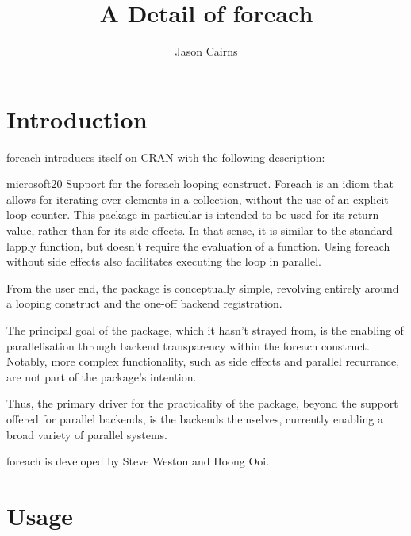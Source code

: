 \documentclass[a4paper,10pt]{article}
\begin{document}
\title{A Detail of foreach}
\author{Jason Cairns}
  
\maketitle{}


\section{Introduction}
\label{sec:introduction}

foreach introduces itself on CRAN with the following description:
\begin{displaycquote}{microsoft20}
  Support for the foreach looping construct. Foreach is an idiom that
  allows for iterating over elements in a collection, without the use
  of an explicit loop counter. This package in particular is intended
  to be used for its return value, rather than for its side effects.
  In that sense, it is similar to the standard lapply function, but
  doesn't require the evaluation of a function. Using foreach without
  side effects also facilitates executing the loop in parallel.
\end{displaycquote}

From the user end, the package is conceptually simple, revolving
entirely around a looping construct and the one-off backend
registration.

The principal goal of the package, which it hasn't strayed from, is
the enabling of parallelisation through backend transparency within
the foreach construct. Notably, more complex functionality, such as
side effects and parallel recurrance, are not part of the package's
intention.

Thus, the primary driver for the practicality of the package, beyond
the support offered for parallel backends, is the backends themselves,
currently enabling a broad variety of parallel systems.

foreach is developed by Steve Weston and Hoong Ooi.

\section{Usage}
\label{sec:usage}
\end{document}
